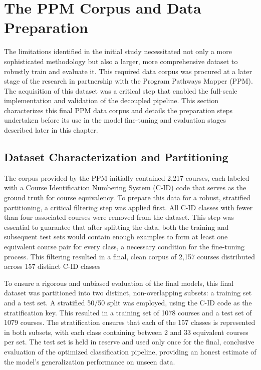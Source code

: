 \section{The PPM Corpus and Data Preparation}\label{ch:3.2}
The limitations identified in the initial study necessitated not only a more sophisticated methodology but also a larger, more comprehensive dataset to robustly train and evaluate it. This required data corpus was procured at a later stage of the research in partnership with the Program Pathways Mapper (PPM). The acquisition of this dataset was a critical step that enabled the full-scale implementation and validation of the decoupled pipeline. This section characterizes this final PPM data corpus and details the preparation steps undertaken before its use in the model fine-tuning and evaluation stages described later in this chapter.

\subsection{Dataset Characterization and Partitioning}\label{ch:3.2.1}
The corpus provided by the PPM initially contained 2,217 courses, each labeled with a Course Identification Numbering System (C-ID) code that serves as the ground truth for course equivalency. To prepare this data for a robust, stratified partitioning, a critical filtering step was applied first. All C-ID classes with fewer than four associated courses were removed from the dataset. This step was essential to guarantee that after splitting the data, both the training and subsequent test sets would contain enough examples to form at least one equivalent course pair for every class, a necessary condition for the fine-tuning process. This filtering resulted in a final, clean corpus of 2,157 courses distributed across 157 distinct C-ID classes

To ensure a rigorous and unbiased evaluation of the final models, this final dataset was partitioned into two distinct, non-overlapping subsets: a training set and a test set. A stratified 50/50 split was employed, using the C-ID code as the stratification key. This resulted in a training set of 1078 courses and a test set of 1079 courses. The stratification ensures that each of the 157 classes is represented in both subsets, with each class containing between 2 and 33 equivalent courses per set.  The test set is held in reserve and used only once for the final, conclusive evaluation of the optimized classification pipeline, providing an honest estimate of the model's generalization performance on unseen data.


